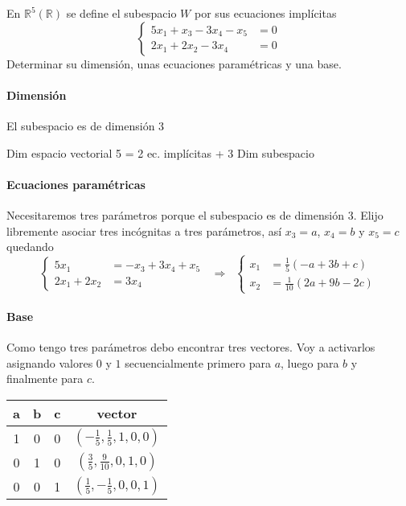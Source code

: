 \begin{problema}{\cite[8p342]{palacios}}{
	En $\mathbb{R}^5(\mathbb{R})$ se define el subespacio $W$ por sus ecuaciones implícitas
	$$\begin{cases}
		5x_1+x_3-3x_4-x_5 &= 0 \\
		2x_1+2x_2-3x_4 &= 0
	\end{cases}$$
	Determinar su dimensión, unas ecuaciones paramétricas y una base.
	}
	\paragraph{Dimensión} El subespacio es de dimensión 3
	\begin{center}
		Dim espacio vectorial 5 = 2 ec. implícitas + 3 Dim subespacio
	\end{center}

	\paragraph{Ecuaciones paramétricas} Necesitaremos tres parámetros porque el subespacio es de
	dimensión 3. Elijo libremente asociar tres incógnitas a tres parámetros, así $x_3=a$,
	$x_4=b$ y $x_5=c$ quedando
	$$\begin{cases}
		5x_1 &= -x_3+3x_4+x_5 \\
		2x_1+2x_2 &= 3x_4
	\end{cases}
	\;\;\Rightarrow\;\;
	\begin{cases}
		x_1 &= \frac{1}{5}(-a+3b+c) \\
		x_2 &= \frac{1}{10}(2a+9b-2c)
	\end{cases}$$

	\paragraph{Base} Como tengo tres parámetros debo encontrar tres vectores. Voy a activarlos
	asignando valores $0$ y $1$ secuencialmente primero para $a$, luego para $b$ y finalmente para
	$c$. 
	\begin{center}
		\begin{tabular}{ccc|c}
			\hline
			\textbf{a} & \textbf{b} & \textbf{c} & \textbf{vector} \\
			\hline
			1 & 0 & 0 & $\left(-\frac{1}{5},\frac{1}{5}, 1, 0, 0\right)$ \\[5pt]
			0 & 1 & 0 & $\left(\frac{3}{5},\frac{9}{10}, 0, 1, 0\right)$ \\[5pt]
			0 & 0 & 1 & $\left(\frac{1}{5},-\frac{1}{5}, 0, 0, 1\right)$ \\[5pt]
			\hline
		\end{tabular}
	\end{center}
\end{problema}

